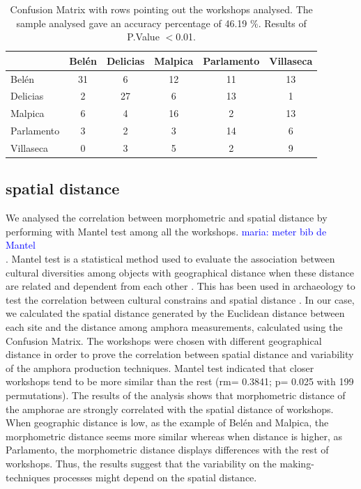 \documentclass[review]{elsarticle}
\newcommand{\memo}[2]{\textcolor{#1}{#2}}
\newcommand{\maria}[1]{\memo{blue}{maria: #1\\}}
\begin{document}
\begin{table}[htp]
\begin{tabular}{lccccc}
\hline
      & Bel\'en & Delicias & Malpica & Parlamento & Villaseca\\ \hline
Bel\'en &   31  &      6   &   12    &     11     &   13 \\
Delicias&  2  &     27   &    6    &     13     &    1  \\
Malpica &  6  &      4   &   16    &      2     &   13   \\
Parlamento & 3&      2   &   3     &      14    &    6    \\
Villaseca  & 0&      3   &    5    &      2     &    9     \\
\hline

\end{tabular}
\caption{Confusion Matrix with rows pointing out the workshops analysed. The sample analysed gave an accuracy percentage of 46.19 $\%$. Results of P.Value $<$0.01. }
\label{table:confusion}
\end{table}

\subsection{spatial distance}

We analysed the correlation between morphometric and spatial distance by performing with Mantel test among all the workshops. \maria{meter bib de Mantel}. Mantel test is a statistical method used to evaluate the association between cultural diversities among objects with geographical distance when these distance are related and dependent from each other \citep{mantel_detection_1967}. This has been used in archaeology to test the correlation between cultural constrains and spatial distance \citep{crema_culture_2014}. In our case, we calculated the spatial distance generated by the Euclidean distance between each site and the distance among amphora measurements, calculated using the Confusion Matrix. The workshops were chosen with different geographical distance in order to prove the correlation between spatial distance and variability of the amphora production techniques. Mantel test indicated that closer workshops tend to be more similar than the rest (rm= 0.3841; p= 0.025 with 199 permutations). The results of the analysis shows that morphometric distance of the amphorae are strongly correlated with the spatial distance of workshops. When geographic distance is low, as the example of Bel\'en and Malpica, the morphometric distance seems more similar whereas when distance is higher, as Parlamento, the morphometric distance displays differences with the rest of workshops. Thus, the results suggest that the variability on the making-techniques processes might depend on the spatial distance.   
\end{document}
